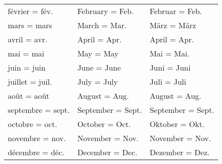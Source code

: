 \begin{table}[!ht]
\begin{center}
\begin{tabular}{lll}
       février = fév.     & February = Feb.    & Februar = Feb.\\
       mars = mars        & March = Mar.       & März = März\\
       avril = avr.       & April = Apr.       & April = Apr.\\
       mai = mai          & May = May          & Mai = Mai.\\
       juin = juin        & June = June        & Juni = Juni\\
       juillet = juil.    & July = July        & Juli = Juli\\
       août = août        & August = Aug.      & August = Aug.\\
       septembre = sept.  & September = Sept.  & September = Sept.\\
       octobre = oct.     & October = Oct.     & Oktober = Okt.\\
       novembre = nov.    & November = Nov.    & November = Nov.\\
       décembre = déc.    & December = Dec.    & Dezember = Dez. \\ 
    \hline
   \end{tabular}
   \end{center}
\end{table}
